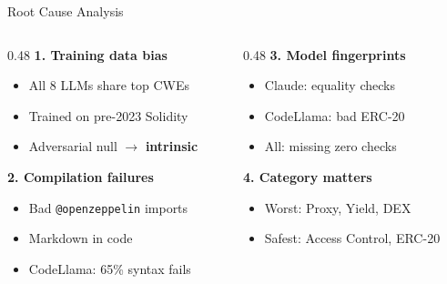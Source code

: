 \documentclass[aspectratio=169]{beamer}
\begin{document}
\begin{frame}{Root Cause Analysis}
\begin{columns}
\begin{column}{0.48\textwidth}
\textbf{1. Training data bias}
\begin{itemize}\small
    \item All 8 LLMs share top CWEs
    \item Trained on pre-2023 Solidity
    \item Adversarial null $\to$ \textbf{intrinsic}
\end{itemize}

\vspace{0.3cm}
\textbf{2. Compilation failures}
\begin{itemize}\small
    \item Bad \texttt{@openzeppelin} imports
    \item Markdown in code
    \item CodeLlama: 65\% syntax fails
\end{itemize}
\end{column}
\begin{column}{0.48\textwidth}
\textbf{3. Model fingerprints}
\begin{itemize}\small
    \item Claude: equality checks
    \item CodeLlama: bad ERC-20
    \item All: missing zero checks
\end{itemize}

\vspace{0.3cm}
\textbf{4. Category matters}
\begin{itemize}\small
    \item Worst: Proxy, Yield, DEX
    \item Safest: Access Control, ERC-20
\end{itemize}
\end{column}
\end{columns}
\end{frame}
\end{document}
